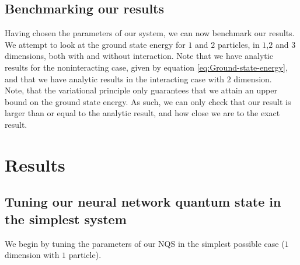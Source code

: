 \documentclass[a4paper, 10pt]{article}
\begin{document}
	\subsection{Benchmarking our results}
	Having chosen the parameters of our system, we can now benchmark our results. We attempt to look at the ground state energy for $1$ and $2$ particles, in $1$,$2$ and $3$ dimensions, both with and without interaction. Note that we have analytic results for the noninteracting case, given by equation \ref{eq:Ground-state-energy}, and that we have analytic results in the interacting case with $2$ dimension.\\
	\linebreak
	Note, that the variational principle only guarantees that we attain an upper bound on the ground state energy. As such, we can only check that our result is larger than or equal to the analytic result, and how close we are to the exact result.
 	\section{Results}
	\subsection{Tuning our neural network quantum state in the simplest system}\label{sec:res_tuning_parameters_noninteracting}
	We begin by tuning the parameters of our NQS in the simplest possible case ($1$ dimension with $1$ particle).
\end{document}
